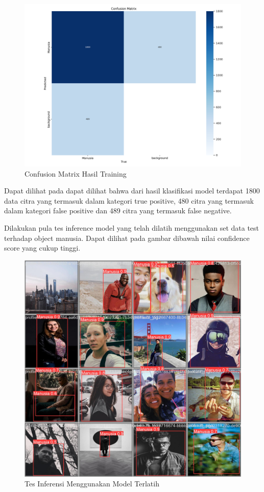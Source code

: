 \begin{figure}[H]
    \centering
    \includegraphics[scale=0.4]{gambar/confusion 150 epoch.png}
    \caption{Confusion Matrix Hasil Training}
    \label{fig:visualisasi hasil training}
\end{figure}

Dapat dilihat pada dapat dilihat bahwa dari hasil klasifikasi model terdapat 1800 data citra yang termasuk dalam kategori true positive, 480 citra yang termasuk dalam kategori false positive dan 489 citra yang termasuk false negative.

Dilakukan pula tes inference model yang telah dilatih menggunakan set data test terhadap object manusia. Dapat dilihat pada gambar dibawah nilai confidence score yang cukup tinggi.

\begin{figure}[H]
    \centering
    \includegraphics[scale=0.1]{gambar/confiden 150 epoch.jpg}
    \caption{Tes Inferensi Menggunakan Model Terlatih}
    \label{fig:visualisasi hasil training}
\end{figure}


